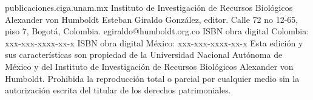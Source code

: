 \begin{multicols}{2}
{    publicaciones.ciga.unam.mx
    \newline Instituto de Investigación de Recursos Biológicos Alexander von Humboldt
    Esteban Giraldo González, editor.
    Calle 72 no 12-65, piso 7, Bogotá, Colombia.
    egiraldo@humboldt.org.co 
    \newline ISBN obra digital Colombia: xxx-xxx-xxxx-xx-x
    \newline ISBN obra digital México: xxx-xxx-xxxx-xx-x
    \linebreak
    \newline Esta edición y sus características son propiedad de la Universidad Nacional Autónoma de México y del Instituto de Investigación de Recursos Biológicos Alexander von Humboldt. Prohibida la reproducción total o parcial por cualquier medio sin la autorización escrita del titular de los derechos patrimoniales.}
\end{multicols}
\vspace*{\fill}

\let\maketitle\oldmaketitle
\maketitle